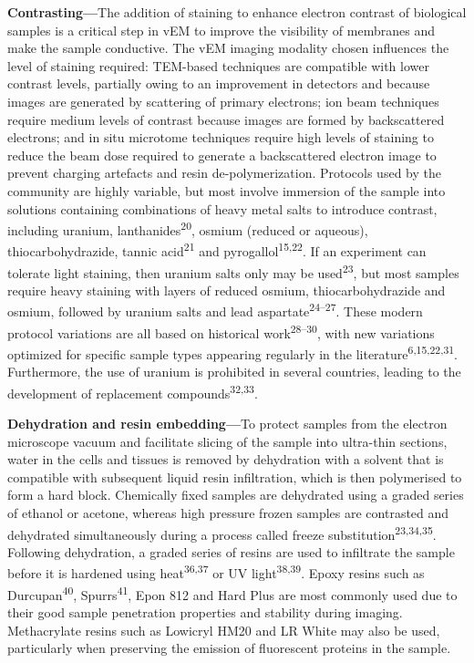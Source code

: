\documentclass{article}
\begin{document}
\textbf{Contrasting—}The addition of staining to enhance electron contrast of biological samples is a critical step in vEM to improve the visibility of membranes and make the sample conductive. The vEM imaging modality chosen influences the level of staining required: TEM-based techniques are compatible with lower contrast levels, partially owing to an improvement in detectors and because images are generated by scattering of primary electrons; ion beam techniques require medium levels of contrast because images are formed by backscattered electrons; and in situ microtome techniques require high levels of staining to reduce the beam dose required to generate a backscattered electron image to prevent charging artefacts and resin de-polymerization. Protocols used by the community are highly variable, but most involve immersion of the sample into solutions containing combinations of heavy metal salts to introduce contrast, including uranium, lanthanides\textsuperscript{20}, osmium (reduced or aqueous), thiocarbohydrazide, tannic acid\textsuperscript{21} and pyrogallol\textsuperscript{15,22}. If an experiment can tolerate light staining, then uranium salts only may be used\textsuperscript{23}, but most samples require heavy staining with layers of reduced osmium, thiocarbohydrazide and osmium, followed by uranium salts and lead aspartate\textsuperscript{24–27}. These modern protocol variations are all based on historical work\textsuperscript{28–30}, with new variations optimized for specific sample types appearing regularly in the literature\textsuperscript{6,15,22,31}. Furthermore, the use of uranium is prohibited in several countries, leading to the development of replacement compounds\textsuperscript{32,33}.


\textbf{Dehydration and resin embedding—}To protect samples from the electron microscope vacuum and facilitate slicing of the sample into ultra-thin sections, water in the cells and tissues is removed by dehydration with a solvent that is compatible with subsequent liquid resin infiltration, which is then polymerised to form a hard block. Chemically fixed samples are dehydrated using a graded series of ethanol or acetone, whereas high pressure frozen samples are contrasted and dehydrated simultaneously during a process called freeze substitution\textsuperscript{23,34,35}. Following dehydration, a graded series of resins are used to infiltrate the sample before it is hardened using heat\textsuperscript{36,37} or UV light\textsuperscript{38,39}. Epoxy resins such as Durcupan\textsuperscript{40}, Spurrs\textsuperscript{41}, Epon 812 and Hard Plus are most commonly used due to their good sample penetration properties and stability during imaging. Methacrylate resins such as Lowicryl HM20 and LR White may also be used, particularly when preserving the emission of fluorescent proteins in the sample.
\end{document}
